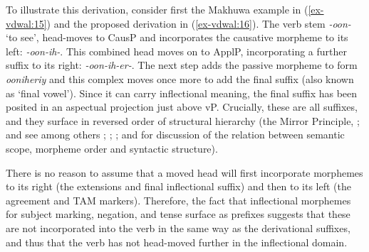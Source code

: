 \documentclass[output=paper
,modfonts
,nonflat]{langsci/langscibook}
\begin{document}
To illustrate this derivation, consider first the Makhuwa example in (\ref{ex-vdwal:15}) and the proposed derivation in (\ref{ex-vdwal:16}). The verb stem \textit{-oon-} ‘to see’, head-moves to CausP and incorporates the causative morpheme to its left: \textit{-oon-ih-}. This combined head moves on to ApplP, incorporating a further suffix to its right: \textit{-oon-ih-er-}. The next step adds the passive morpheme to form \textit{ooniheriy} and this complex moves once more to add the final suffix (also known as ‘final vowel’). Since it can carry inflectional meaning, the final suffix has been posited in an aspectual projection just above vP. Crucially, these are all suffixes, and they surface in reversed order of structural hierarchy (the Mirror Principle, \citealt{Baker1985, Baker1988}; and see among others \citealt{Alsina1999}; \citealt{Hyman2003}; \citealt{Good2005}; and \citealt{Muriungi2008} for discussion of the relation between semantic scope, morpheme order and syntactic structure).



\begin{figure}[!h]
\begin{exe}
\end{exe} \vspace{-0.9cm}
\end{figure} 
\noindent There is no reason to assume that a moved head will first incorporate morphemes to its right (the extensions and final inflectional suffix) and then to its left (the agreement and TAM markers). Therefore, the fact that inflectional morphemes for subject marking, negation, and tense surface as prefixes suggests that these are not incorporated into the verb in the same way as the derivational suffixes, and thus that the verb has not head-moved further in the inflectional domain.
\end{document}
